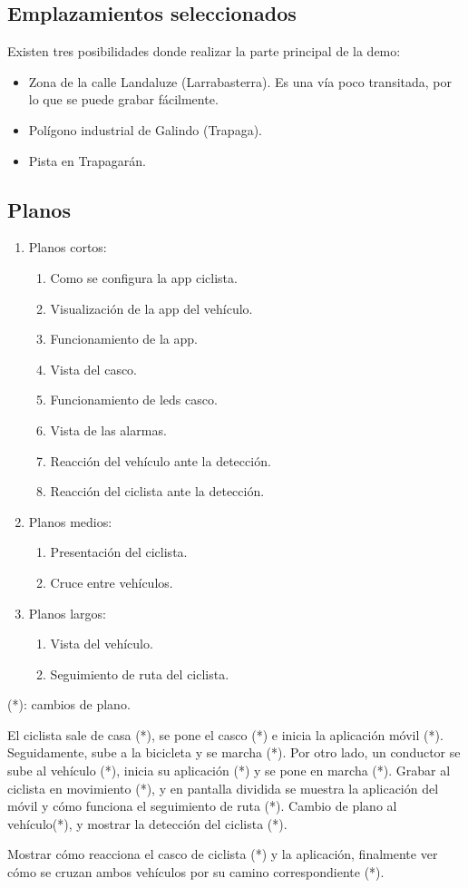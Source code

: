 \subsection{Emplazamientos seleccionados}
Existen tres posibilidades donde realizar la parte principal de la demo:
\begin{itemize}
	\item Zona de la calle Landaluze (Larrabasterra). Es una vía poco transitada,
	por lo que se puede grabar fácilmente.

	\item Polígono industrial de Galindo (Trapaga).

	\item Pista en Trapagarán.
\end{itemize}

\subsection{Planos}
\begin{enumerate}
	\item Planos cortos:
	\begin{enumerate}
		\item Como se configura la app ciclista.
		\item Visualización de la app del vehículo.
		\item Funcionamiento de la app.
		\item Vista del casco.
		\item Funcionamiento de leds casco.
		\item Vista de las alarmas.
		\item Reacción del vehículo ante la detección.
		\item Reacción del ciclista ante la detección.
	\end{enumerate}

	\item Planos medios:
	\begin{enumerate}
		\item Presentación del ciclista.
		\item Cruce entre vehículos.
	\end{enumerate}

	\item Planos largos:
	\begin{enumerate}
		\item Vista del vehículo.
		\item Seguimiento de ruta del ciclista.
	\end{enumerate}
\end{enumerate}
(*): cambios de plano.

El ciclista sale de casa (*), se pone el casco (*) e inicia la aplicación
móvil (*). Seguidamente, sube a la bicicleta y se marcha (*). Por otro lado,
un conductor se sube al vehículo (*), inicia su aplicación (*) y se pone en
marcha (*). Grabar al ciclista en movimiento (*), y en pantalla dividida se
muestra la aplicación del móvil y cómo funciona el seguimiento de ruta (*).
Cambio de plano al vehículo(*), y mostrar la detección del ciclista (*).

Mostrar cómo reacciona el casco de ciclista (*) y la aplicación, finalmente
ver cómo se cruzan ambos vehículos por su camino correspondiente (*).
